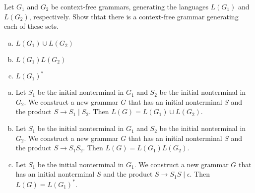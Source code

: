 \documentclass[../main.tex]{subfiles}
\begin{document}
Let $G_1$ and $G_2$ be context-free grammars,
generating the languages $L(G_1)$ and $L(G_2)$, respectively.
Show thtat there is a context-free grammar generating each of these sets.
\begin{enumerate}[a)]
	\item $L(G_1)\cup{}L(G_2)$
	\item $L(G_1)L(G_2)$
	\item $L(G_1)^\ast$
\end{enumerate}

\solution
\begin{enumerate}[a)]
	\item Let $S_1$ be the initial nonterminal in $G_1$ and $S_2$ be the initial nonterminal in $G_2$.
     We construct a new grammar $G$ that has an initial nonterminal $S$ and the product
     $S \rightarrow S_1 \mid S_2$. Then $L(G) = L(G_1)\cup{}L(G_2)$. 
	\item Let $S_1$ be the initial nonterminal in $G_1$ and $S_2$ be the initial nonterminal in $G_2$.
    We construct a new grammar $G$ that has an initial nonterminal $S$ and the product
    $S \rightarrow S_1S_2$. Then $L(G) = L(G_1)L(G_2)$. 
	\item Let $S_1$ be the initial nonterminal in $G_1$.
    We construct a new grammar $G$ that has an initial nonterminal $S$ and the product
    $S \rightarrow S_1S \mid \epsilon$. Then $L(G) = L(G_1)^\ast$.
\end{enumerate}
\end{document}
